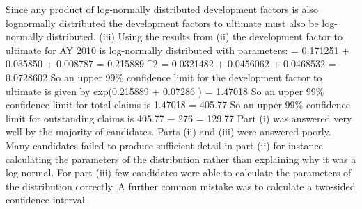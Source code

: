 Since any product of log-normally distributed development factors is also lognormally distributed the development factors to ultimate must also be log-
normally distributed.
(iii)
Using the results from (ii) the development factor to ultimate for AY 2010 is
log-normally distributed with parameters:
\mu  = 0.171251 + 0.035850 + 0.008787 = 0.215889
\sigma^{2} = 0.0321482 + 0.0456062 + 0.0468532 = 0.0728602
So an upper 99\% confidence limit for the development factor to ultimate is
given by exp(0.215889 + 0.07286 ) = 1.47018
So an upper 99\% confidence limit for total claims is
1.47018  = 405.77
So an upper 99\% confidence limit for outstanding claims is
405.77 − 276 = 129.77
Part (i) was answered very well by the majority of candidates. Parts (ii) and (iii) were answered poorly. Many candidates failed to produce sufficient detail in part (ii) for
instance calculating the parameters of the distribution rather than explaining why it was a log-normal. For part (iii) few candidates were able to calculate the parameters
of the distribution correctly. A further common mistake was to calculate a two-sided confidence interval.



